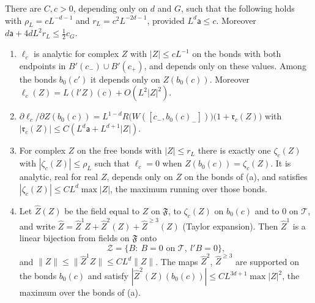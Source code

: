 \begin{lemma}\label{lem:eliminate}
There are $C,c>0$, depending only on $d$ and $G$, such that the following holds with $\rho_L=cL^{-d-1}$ and $r_L=c^2L^{-2d-1}$, provided $L^{d}\mathsf a\le c$. Moreover $d\mathsf a+4dL^2r_L\le\frac12c_G$.
\begin{enumerate}[label=(\alph*)]
\item $\ell_c$ is analytic for complex $Z$ with $|Z|\le cL^{-1}$ on the bonds with both endpoints in $B'(c_-)\cup B'(c_+)$, and depends only on these values. Among the bonds $b_0(c')$ it depends only on $Z(b_0(c))$. Moreover $\ell_c(Z)=L(l'Z)(c)+O(L^2|Z|^2)$.
\item $\partial\ell_c/\partial Z(b_0(c))=L^{1-d}R\big(W([c_-,b_0(c)_-])\big)\big(1+\mathfrak r_c(Z)\big)$ with $|\mathfrak r_c(Z)|\le C(L^d\mathsf a+L^{d+1}|Z|)$.
\item For complex $Z$ on the free bonds with $|Z|\le r_L$ there is exactly one $\zeta_c(Z)$ with $|\zeta_c(Z)|\le\rho_L$ such that $\ell_c=0$ when $Z(b_0(c))=\zeta_c(Z)$. It is analytic, real for real $Z$, depends only on $Z$ on the bonds of (a), and satisfies $|\zeta_c(Z)|\le CL^d\max|Z|$, the maximum running over those bonds.
\item Let $\hat Z(Z)$ be the field equal to $Z$ on $\mathfrak F$, to $\zeta_c(Z)$ on $b_0(c)$ and to $0$ on $\mathcal T$, and write $\hat Z=\hat Z^1Z+\hat Z^2(Z)+\hat Z^{\ge3}(Z)$ (Taylor expansion). Then $\hat Z^1$ is a linear bijection from fields on $\mathfrak F$ onto
\[
\mathcal Z=\{B:\ B=0\text{ on }\mathcal T,\ l'B=0\},
\]
and $\|Z\|\le\|\hat Z^1Z\|\le CL^{d}\|Z\|$. The maps $\hat Z^2$, $\hat Z^{\ge3}$ are supported on the bonds $b_0(c)$ and satisfy $|\hat Z^2(Z)(b_0(c))|\le CL^{3d+1}\max|Z|^2$, the maximum over the bonds of (a).
\end{enumerate}
\end{lemma}

